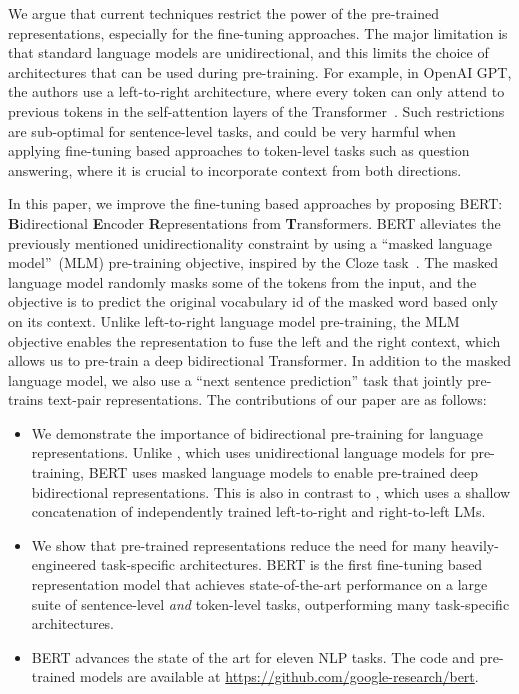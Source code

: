 \documentclass[11pt,a4paper]{article}
\newcommand\bert{BERT\xspace}
\begin{document}
We argue that current techniques restrict the power of the pre-trained representations, especially for the fine-tuning approaches. The major limitation is that standard language models are unidirectional, and this limits the choice of architectures that can be used during pre-training. For example, in OpenAI GPT, the authors use a left-to-right architecture, where every token can only attend to previous tokens in the self-attention layers of the Transformer~\cite{vaswani-etal:2017:_atten}. Such restrictions are sub-optimal for sentence-level tasks, and could be very harmful when applying fine-tuning based approaches to token-level tasks such as  question answering, where it is crucial to incorporate context from both directions.

In this paper, we improve the fine-tuning based approaches by proposing \bert: \textbf{B}idirectional \textbf{E}ncoder \textbf{R}epresentations from \textbf{T}ransformers. \bert alleviates the previously mentioned unidirectionality constraint by using a ``masked language model''~(MLM) pre-training objective, inspired by the Cloze task~\cite{taylor:1953:_cloze}. The masked language model randomly masks some of the tokens from the input, and the objective is to predict the original vocabulary id of the masked word based only on its context. Unlike left-to-right language model pre-training, the MLM objective enables the representation to fuse the left and the right context, which allows us to pre-train a deep bidirectional Transformer. In addition to the masked language model, we also use a ``next sentence prediction'' task that jointly pre-trains text-pair representations. The contributions of our paper are as follows:
\begin{itemize}[leftmargin=1em]
  \item We demonstrate the importance of bidirectional pre-training for language representations. Unlike \citet{radford-etal:2018}, which uses unidirectional language models for pre-training, \bert uses masked language models to enable pre-trained deep bidirectional representations. This is also in contrast to \citet{peters-etal:2018:_deep}, which uses a shallow concatenation of independently trained left-to-right and right-to-left LMs.
  \item We show that pre-trained representations reduce the need for many heavily-engineered task-specific architectures. \bert is the first fine-tuning based representation model that achieves state-of-the-art performance on a large suite of sentence-level {\em and} token-level tasks, outperforming many task-specific architectures.
  \item \bert advances the state of the art for eleven NLP tasks. 
    The code and pre-trained models are available at \url{https://github.com/google-research/bert}.
\end{itemize}
\end{document}

